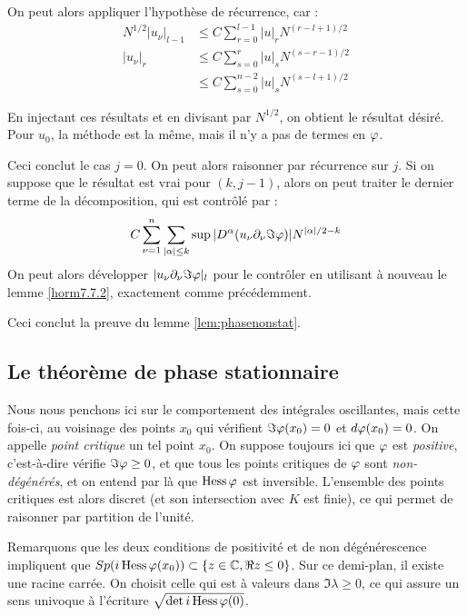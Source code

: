 \noindent On peut alors appliquer l'hypothèse de récurrence, car :
\begin{align*}
N^{1/2}|u_{\nu}|_{l-1} &\leq C \sum_{r=0}^{l-1} |u|_r N^{(r-l+1)/2}\\
|u_{\nu}|_r & \leq C\sum_{s=0}^{r}|u|_sN^{(s-r-1)/2}\\
  &\leq C\sum_{s=0}^{n-2}|u|_sN^{(s-l+1)/2}
\end{align*}

\noindent En injectant ces résultats et en divisant par $N^{1/2}$, on obtient le résultat désiré. Pour $u_0$, la méthode est la même, mais il n'y a pas de termes en $\varphi$.

Ceci conclut le cas $j=0$. On peut alors raisonner par récurrence sur $j$. Si on suppose que le résultat est vrai pour $(k,j-1)$, alors on peut traiter le dernier terme de la décomposition, qui est contrôlé par :
\begin{equation*}
  C \sum_{\nu=1}^{n} \sum_{|\alpha| \leq
    k}\sup|D^{\alpha}(u_{\nu}\partial_{\nu}\Im \varphi)| N^{|\alpha|/2-k}
\end{equation*}
\noindent On peut alors développer $|u_{\nu}\partial_{\nu}\Im \varphi|_l$ pour le contrôler en utilisant à nouveau le lemme \ref{horm7.7.2}, exactement comme précédemment.

Ceci conclut la preuve du lemme \ref{lem:phasenonstat}.

\subsection{Le théorème de phase stationnaire}

Nous nous penchons ici sur le comportement des intégrales oscillantes, mais cette fois-ci, au voisinage des points $x_0$ qui vérifient $\Im \varphi(x_0) = 0$ et $d\varphi(x_0)=0$. On appelle \emph{point critique} un tel point $x_0$. On suppose toujours ici que $\varphi$ est \emph{positive}, c'est-à-dire vérifie $\Im \varphi \geq 0$, et que tous les points critiques de $\varphi$ sont \emph{non-dégénérés}, et on entend par là que $\operatorname{Hess} \varphi$ est inversible.
L'ensemble des points critiques est alors discret (et son intersection avec $K$ est finie), ce qui permet de raisonner par partition de l'unité.

Remarquons que les deux conditions de positivité et de non dégénérescence impliquent que  $Sp(i\operatorname{Hess}\varphi(x_0)) \subset \{z \in \mathbb{C}, \Re z \leq 0\}$. Sur ce demi-plan, il existe une racine carrée. On choisit celle qui est à valeurs dans $\Im \lambda \geq 0$, ce qui assure un sens univoque à l'écriture $\sqrt{\det i\operatorname{Hess} \varphi (0)}$.

